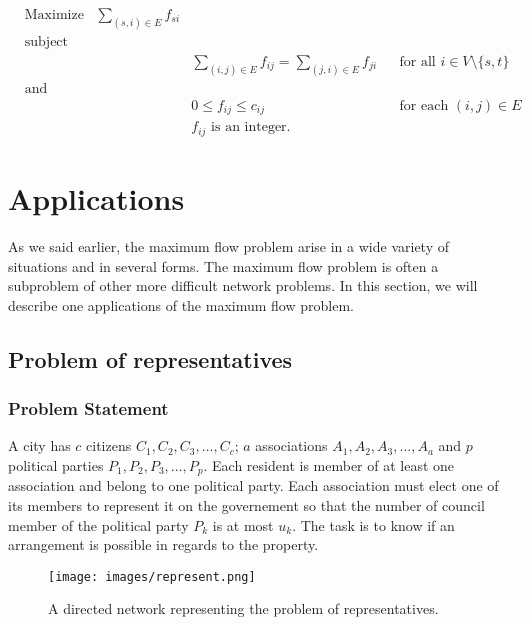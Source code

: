 \begin{equation}
\begin{aligned}
& {\text{Maximize}} & \sum\limits_{(s,i) \in E} f_{si} & & &\\
& \text{subject to} & & & &\\
& & & \sum\limits_{(i,j)\in E} f_{ij} = \sum\limits_{(j,i)\in E} f_{ji} & & \text{for all } i \in V \setminus \{s, t\}\\
& \text{and} & & & & \\
& & & 0 \leq f_{ij} \leq c_{ij} & & \text{for each } (i, j) \in E\\
& & & f_{ij} \text{ is an integer.}& &
\end{aligned}
\end{equation}

\section{Applications}
\label{sec:applications}
As we said earlier, the maximum flow problem arise in a wide variety of situations and in several forms. The maximum flow problem is often a subproblem of other more difficult network problems. In this section, we will describe one applications of the maximum flow problem.

\subsection{Problem of representatives}

\subsubsection{Problem Statement}

A city has $c$ citizens $C_1, C_2, C_3, ..., C_c$; $a$ associations $A_1, A_2, A_3, ..., A_a$ and $p$ political parties $P_1, P_2, P_3, ..., P_p$. Each resident is member of at least one association and belong to one political party. Each association  must elect one of its members to represent it on the governement so that the number of council member of the political party $P_k$ is at most $u_k$. The task is to know if an arrangement is possible in regards to the property.

\begin{figure}[h]
\centering
\texttt{[image: images/represent.png]}
\caption{A directed network representing the problem of representatives.}
\label{img:represent}
\end{figure}

